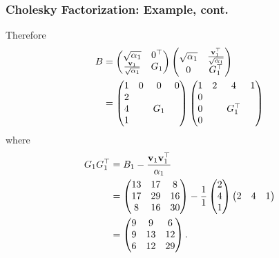 \documentclass{beamer}
\begin{document}
\begin{frame}\frametitle{Cholesky Factorization: Example, cont.}
	Therefore
	\begin{align*}
		B &= \begin{pmatrix}
 				\sqrt{\alpha_1} & 0^\top \\ \frac{\mathbf{v}_1}{\sqrt{\alpha_1}} & G_1
 			 \end{pmatrix}
 			 \begin{pmatrix}
 				\sqrt{\alpha_1} & \frac{\mathbf{v}_1^\top}{\sqrt{\alpha_1}} \\ 0 & G_1^\top
 			 \end{pmatrix} \\
 		&= \begin{pmatrix}
				1 & 0 & 0 & 0 \\
				2 &   &   &   \\
				4 &   & G_1 & \\
				1 &   &   & 
			\end{pmatrix}
			\begin{pmatrix}
				1 & 2 & 4 & 1 \\
				0 &   &   &   \\
				0 &   & G_1^\top & \\
				0 &   &   & 
			\end{pmatrix}
	\end{align*}
	where
	\begin{align*}
		G_1 G_1^\top &= B_1 - \frac{\mathbf{v}_1 \mathbf{v}_1^\top}{\alpha_1} \\
		&= \begin{pmatrix}
 				13 & 17 & 8 \\
 				17 & 29 & 16 \\
 				8 & 16 & 30	
 			\end{pmatrix}
 			- \frac{1}{1}\begin{pmatrix} 2 \\ 4 \\ 1 \end{pmatrix}
 			  \begin{pmatrix} 2 & 4 & 1 \end{pmatrix} \\
 		&= 	\begin{pmatrix}
 				9 & 9 & 6 \\ 9 & 13 & 12 \\ 6 & 12 & 29
 			\end{pmatrix}.
	\end{align*}
\end{frame}
\end{document}
